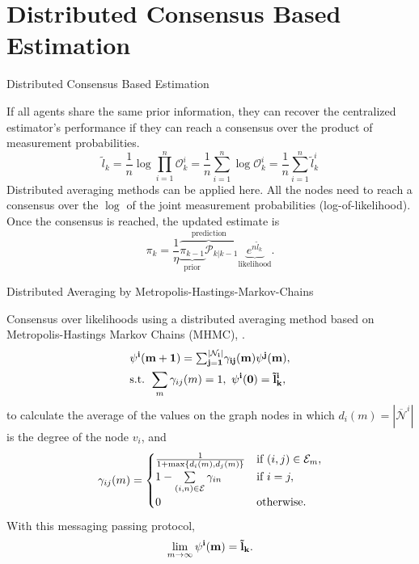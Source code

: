 \documentclass{beamer}
\newcommand{\vect}{\bf}
\theoremstyle{remark}
\begin{document}
\section{Distributed Consensus Based Estimation}
\begin{frame}{Distributed Consensus Based Estimation}
	
	If all agents share the same prior information, they can recover the centralized estimator's performance if they can reach a consensus over the product of measurement probabilities.
	{\color{blue}\begin{equation*}
		\tilde{l}_k  = \frac{1}{n} \log \prod_{i=1}^{n} \mathcal{O}_k^i  = \frac{1}{n} \sum_{i=1}^{n} \log \mathcal{O}_k^i = \frac{1}{n} \sum_{i=1}^{n} \tilde{l}_k^i
		\end{equation*}}
	{\color{red}Distributed averaging methods can be applied here.} All the nodes need to reach a consensus over the $\log$ of the joint measurement probabilities (log-of-likelihood).
	Once the consensus is reached, the updated estimate is 
	{\color{blue}
		\begin{equation*}
			{\pi}_{k}  = \frac{1}{\eta}\overbrace{ \underbrace{{\pi}_{k-1}}_{\text{prior}} 
				\mathcal{P}_{k \vert k-1}  
			}^{\text{prediction}}\underbrace{e^{n\tilde{l}_k}}_{\text{likelihood}}.
		\end{equation*}}
\end{frame}

\begin{frame}{Distributed Averaging by Metropolis-Hastings-Markov-Chains}

Consensus over likelihoods using a distributed averaging method based on Metropolis-Hastings Markov Chains (MHMC), {\color{olive}\cite{boyd_fastest_2003}}. 
\begin{align*}
&\vect{\psi}^i(m+1)=\textstyle {\sum\nolimits _{j=1}^{|\mathcal{N}_{i}|}} \gamma_{ij}(m)\vect{\psi}^j(m),\\
& \text{s.t. } \sum_{m}  \gamma_{ij}(m) = 1,\,\,  \vect{\psi}^i(0)=  \tilde{l}_k^i,\nonumber
\end{align*}
to calculate the average of the values on the graph nodes in which $d_{i}(m)=|\overline{\mathcal{N}}^i|$ is the degree of the node $v_i$, and 
\begin{equation*}
\label{eq:mhmc}
\gamma_{ij}(m) =
\begin{cases}
{1\over 1+\max\{d_{i}(m),d_{j}(m)\}}      &  \text{if } (i,j) \in \mathcal{E}_{m}, \\
1-\sum\limits_{{(i,n)} \in \mathcal{E}}\gamma_{in}  &  \text{if } i = j,\\
0 & \text{otherwise}.
\end{cases}
\end{equation*}
With this messaging passing protocol, $$\lim_{m\rightarrow \infty} \vect{\psi}^i(m) = \tilde{l}_k.$$

	
\end{frame}
\end{document}
